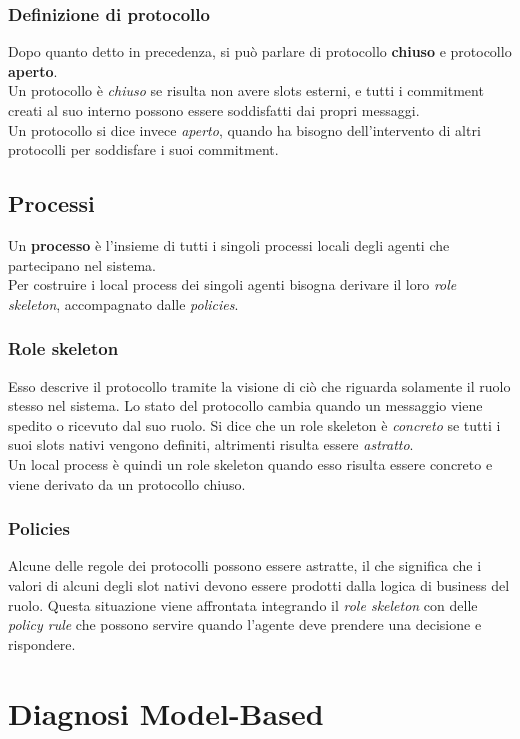 \documentclass[a4paper,12pt]{report}
\begin{document}
\subsection{Definizione di protocollo}
Dopo quanto detto in precedenza, si può parlare di protocollo \textbf{chiuso} e protocollo \textbf{aperto}.\\
Un protocollo è \textit{chiuso} se risulta non avere slots esterni, e tutti i commitment creati al suo interno possono essere soddisfatti dai propri messaggi.\\
Un protocollo si dice invece \textit{aperto}, quando ha bisogno dell'intervento di altri protocolli per soddisfare i suoi commitment.
\newpage
\section{Processi}
Un \textbf{processo} è l'insieme di tutti i singoli processi locali degli agenti che partecipano nel sistema.\\
Per costruire i local process dei singoli agenti bisogna derivare il loro \textit{role skeleton}, accompagnato dalle \textit{policies}.
\subsection{Role skeleton}
Esso descrive il protocollo tramite la visione di ciò che riguarda solamente il ruolo stesso nel sistema. Lo stato del protocollo cambia quando un messaggio viene spedito o ricevuto dal suo ruolo.
Si dice che un role skeleton è \textit{concreto} se tutti i suoi slots nativi vengono definiti, altrimenti risulta essere \textit{astratto}.\\
Un local process è quindi un role skeleton quando esso risulta essere concreto e viene derivato da un protocollo chiuso.
\subsection{Policies}
Alcune delle regole dei protocolli possono essere astratte, il che significa che i valori di alcuni degli slot nativi devono essere prodotti dalla logica di business del ruolo. Questa situazione viene affrontata integrando il \textit{role skeleton} con delle \textit{policy rule} che possono servire quando l'agente deve prendere una decisione e rispondere.
\chapter{Diagnosi Model-Based}
\end{document}
